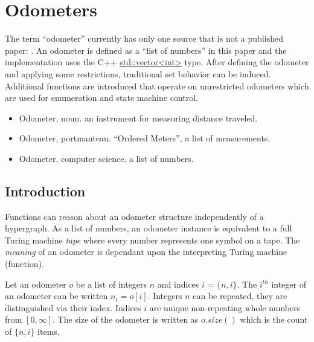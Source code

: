 















\chapter{Odometers}
\label{Odometers}
The term ``odometer'' currently has only one source that is not a published paper: \cite{Odometer:Fuchs}. An odometer is defined as a ``list of numbers'' in this paper and the implementation uses the C++ \url{std::vector<int>} type. After defining the odometer and applying some restrictions, traditional set behavior can be induced. Additional functions are introduced that operate on unrestricted odometers which are used for enumeration and state machine control. 

\begin{itemize}
\item Odometer, noun. an instrument for measuring distance traveled.
\item Odometer, portmanteau. ``Ordered Meters'', a list of measurements.
\item Odometer, computer science. a list of numbers. 
\end{itemize}


\section{Introduction}

Functions can reason about an odometer structure independently of a hypergraph. As a list of numbers, an odometer instance is equivalent to a full Turing machine \textit{tape} where every number represents one symbol on a tape. The \textit{meaning} of an odometer is dependant upon the interpreting Turing machine (function).

\begin{definition}
Let an odometer $o$ be a list of integers $n$ and indices $i$ = $\{n,i\}$. The $i^{th}$  integer of an odometer can be written $n_i = o[i]$. Integers $n$ can be repeated, they are distinguished via their index. Indices $i$ are unique non-repeating whole numbers from $[0,\infty]$. The size of the odometer is written as $o.size()$ which is the count of $\{n,i\}$ items. 
\end{definition}

